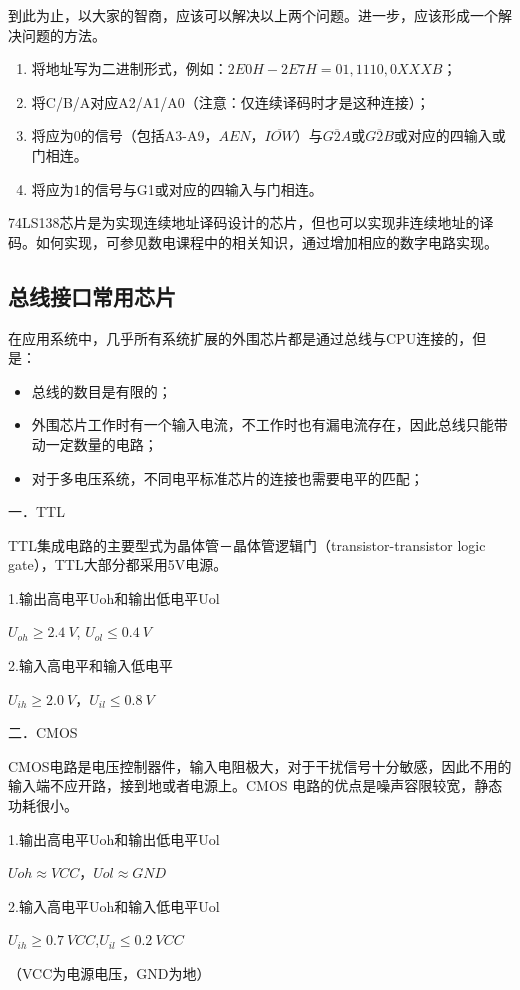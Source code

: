 到此为止，以大家的智商，应该可以解决以上两个问题。进一步，应该形成一个解决问题的方法。

\begin{enumerate}
  \item 将地址写为二进制形式，例如：$2E0H-2E7H=01,1110,0XXXB$；
  \item 将C/B/A对应A2/A1/A0（注意：仅连续译码时才是这种连接）；
  \item 将应为0的信号（包括A3-A9，${AEN}$，$\overline{IOW}$）与$\overline{G2A}$或$\overline{G2B}$或对应的四输入或门相连。
  \item 将应为1的信号与G1或对应的四输入与门相连。
\end{enumerate}

\begin{remark}
  74LS138芯片是为实现连续地址译码设计的芯片，但也可以实现非连续地址的译码。如何实现，可参见数电课程中的相关知识，通过增加相应的数字电路实现。
\end{remark}



\subsection{总线接口常用芯片}


在应用系统中，几乎所有系统扩展的外围芯片都是通过总线与CPU连接的，但是：


\begin{itemize}
  \item  总线的数目是有限的；

  \item 外围芯片工作时有一个输入电流，不工作时也有漏电流存在，因此总线只能带动一定数量的电路；

  \item 对于多电压系统，不同电平标准芯片的连接也需要电平的匹配；

\end{itemize}


\begin{remark}

一．TTL

      TTL集成电路的主要型式为晶体管－晶体管逻辑门（transistor-transistor logic gate），TTL大部分都采用5V电源。

      1.输出高电平Uoh和输出低电平Uol

      $U_{oh}\ge 2.4~V$, $U_{ol}\le 0.4~V$

      2.输入高电平和输入低电平

      $U_{ih}\ge 2.0~V$，$U_{il}\le 0.8~V$

二．CMOS

      CMOS电路是电压控制器件，输入电阻极大，对于干扰信号十分敏感，因此不用的输入端不应开路，接到地或者电源上。CMOS 电路的优点是噪声容限较宽，静态功耗很小。

1.输出高电平Uoh和输出低电平Uol

$Uoh\approx VCC$，$Uol\approx GND$

2.输入高电平Uoh和输入低电平Uol

$U_{ih}\ge 0.7~VCC$,$U_{il}\le 0.2~VCC$

（VCC为电源电压，GND为地）

\end{remark}

